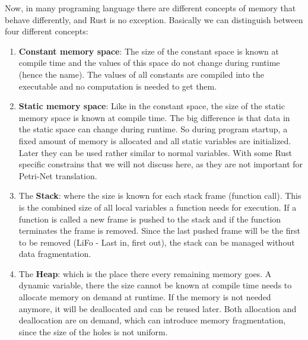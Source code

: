 Now, in many programing language there are different concepts of memory that behave differently, and Rust is no exception.
Basically we can distinguish between four different concepts:
\begin{enumerate}
    \item \textbf{Constant memory space}: The size of the constant space is known at compile time and the values of this space do not change during runtime (hence the name).
    The values of all constants are compiled into the executable and no computation is needed to get them.
    \item \textbf{Static memory space}: Like in the constant space, the size of the static memory space is known at compile time.
    The big difference is that data in the static space can change during runtime.
    So during program startup, a fixed amount of memory is allocated and all static variables are initialized.
    Later they can be used rather similar to normal variables. With some Rust specific constrains that we will not discuss here, as they are not important for Petri-Net translation.
    \item The \textbf{Stack}: where the size is known for each stack frame (function call).
    This is the combined size of all local variables a function needs for execution.
    If a function is called a new frame is pushed to the stack and if the function terminates the frame is removed.
    Since the last pushed frame will be the first to be removed (LiFo - Last in, first out), the stack can be managed without data fragmentation.
    \item The \textbf{Heap}: which is the place there every remaining memory goes.
    A dynamic variable, there the size cannot be known at compile time needs to allocate memory on demand at runtime.
    If the memory is not needed anymore, it will be deallocated and can be reused later.
    Both allocation and deallocation are on demand, which can introduce memory fragmentation, since the size of the holes is not uniform.
\end{enumerate}

